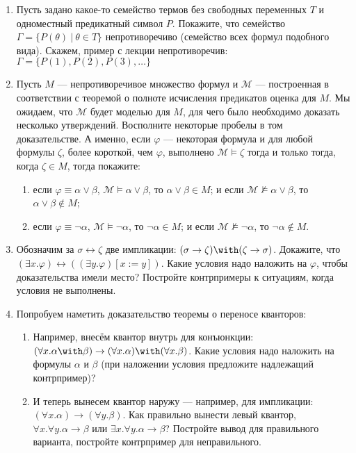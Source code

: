 \documentclass[10pt,a4paper,oneside]{article}
\begin{document}
\begin{enumerate}
\item Пусть задано какое-то семейство термов без свободных переменных $T$ и одноместный предикатный символ $P$.
Покажите, что семейство $\Gamma = \{ P(\theta)\ |\ \theta \in T \}$ непротиворечиво (семейство всех формул подобного вида).
Скажем, пример с лекции непротиворечив: $\Gamma = \{ P(1), P(2), P(3), \dots \}$
\item Пусть $M$ --- непротиворечивое множество формул и $\mathcal{M}$ --- построенная в соответствии с теоремой о 
полноте исчисления предикатов оценка для $M$. Мы ожидаем, что $\mathcal{M}$ будет моделью для $M$, для чего было необходимо доказать
несколько утверждений. Восполните некоторые пробелы в том доказательстве. А именно, если $\varphi$ --- 
некоторая формула и для любой формулы $\zeta$, более короткой, чем $\varphi$, выполнено
$\mathcal{M}\models\zeta$ тогда и только тогда, когда $\zeta\in M$, тогда покажите:
\begin{enumerate}
\item если $\varphi \equiv \alpha\vee\beta$, $\mathcal{M}\models\alpha\vee\beta$, то $\alpha\vee\beta\in M$; и если $\mathcal{M}\not\models\alpha\vee\beta$, то $\alpha\vee\beta\notin M$;
\item если $\varphi \equiv \neg\alpha$, $\mathcal{M}\models\neg\alpha$, то $\neg\alpha\in M$; и если $\mathcal{M}\not\models\neg\alpha$, то $\neg\alpha\notin M$.
\end{enumerate}
\item Обозначим за $\sigma\leftrightarrow\zeta$ две импликации: $(\sigma\rightarrow\zeta)\with(\zeta\rightarrow\sigma)$.
Докажите, что $(\exists x.\varphi) \leftrightarrow ((\exists y.\varphi)[x := y])$. Какие условия надо наложить на $\varphi$, чтобы доказательства имели место?
Постройте контрпримеры к ситуациям, когда условия не выполнены.
\item Попробуем наметить доказательство теоремы о переносе кванторов:
\begin{enumerate}
\item Например, внесём квантор внутрь для конъюнкции: $(\forall x.\alpha\with\beta) \rightarrow (\forall x.\alpha)\with(\forall x.\beta)$. Какие условия надо наложить на формулы $\alpha$ и $\beta$
(при наложении условия предложите надлежащий контрпример)?
\item И теперь вынесем квантор наружу --- например, для импликации: $(\forall x.\alpha)\rightarrow(\forall y.\beta)$. Как правильно вынести левый квантор, 
$\forall x.\forall y.\alpha\rightarrow\beta$ или $\exists x.\forall y.\alpha\rightarrow\beta$? Постройте вывод для правильного варианта, постройте контрпример для неправильного.

\end{enumerate}
\end{enumerate}
\end{document}

